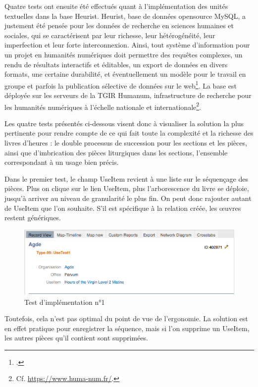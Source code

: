 \documentclass[a4paper,12pt,twoside]{book}
\begin{document}
	Quatre tests ont ensuite été effectués quant à l'implémentation des unités textuelles dans la base Heurist. Heurist, base de données opensource MySQL, a justement été pensée pour les données de recherche en sciences humaines et sociales, qui se caractérisent par leur richesse, leur hétérogénéité, leur imperfection et leur forte interconnexion. Ainsi, tout système d’information pour un projet en humanités numériques doit permettre des requêtes complexes, un rendu de résultats interactifs et éditables, un export de données en divers formats, une certaine durabilité, et éventuellement un modèle pour le travail en groupe et parfois la publication sélective de données sur le web\footcite{bd_Heurist}. La base est déployée sur les serveurs de la TGIR Humanum, infrastructure de recherche pour les humanités numériques à l'échelle nationale et internationale\footnote{Cf. \url{https://www.huma-num.fr/}.}. 
	
	Les quatre tests présentés ci-dessous visent donc à visualiser la solution la plus pertinente pour rendre compte de ce qui fait toute la complexité et la richesse des livres d'heures : le double processus de succession pour les sections et les pièces, ainsi que d'imbrication des pièces liturgiques dans les sections, l'ensemble correspondant à un usage bien précis. 
	
	Dans le premier test, le champ \og UseItem\fg{} revient à une liste sur le séquençage des pièces. Plus on clique sur le lien \og UseItem\fg{}, plus l’arborescence du livre se déploie, jusqu’à arriver au niveau de granularité le plus fin. On peut donc rajouter autant de \og UseItem\fg{} que l’on souhaite. S’il est spécifique à la relation créée, les œuvres restent génériques.
	
    \begin{figure}[!h]
    \centering
    \includegraphics[width=15cm]{img/Modelisation/Tests_Implementation/UseTest1.png}
    \caption{Test d'implémentation n°1}
    \end{figure}
	
 Toutefois, cela n’est pas optimal du point de vue de l’ergonomie. La solution est en effet pratique pour enregistrer la séquence, mais si l’on supprime un \og UseItem\fg{}, les autres pièces qu'il contient sont supprimées. \\
 
\end{document}
